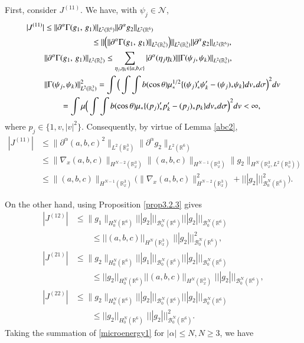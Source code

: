 \documentclass{amsart}[12pt, article]
\begin{document}
First, consider $J^{(11)}$. We have, with $\psi_j\in\mathcal{N}$,
\begin{align}\label{J11}
|J^{(11)}|&
\le
\|{{\partial}}^\alpha\Gamma(g_1,\,g_1)\|_{L^2({{{\mathbb R}}}^6)}    \|{{\partial}}^\alpha g_2\|_{L^2({{{\mathbb R}}}^6)}
\\&
\notag
\hspace*{2cm}\le \|\Big(\|{{\partial}}^\alpha \Gamma(g_1,\,g_1)\|_{L^2({{{\mathbb R}}}^3_v)}
\Big)\|_{L^2({{{\mathbb R}}}^3_x)}    \|{{\partial}}^\alpha g_2\|_{L^2({{{\mathbb R}}}^6)},
\\ \notag
&\| {{\partial}}^\alpha\Gamma(g_1,\,g_1)\|_{L^2({{{\mathbb R}}}^3_v)}\le
\sum_{\eta_j,\eta_k\in \{a,b,c\}} |{{\partial}}^\alpha(\eta_j\eta_k)|
\|\Gamma(\psi_j,\psi_k)\|_{L^2({{{\mathbb R}}}^3_v)},
\\ \notag
&\|\Gamma(\psi_j,\psi_k)\|_{L^2({{{\mathbb R}}}^3_v)}^2=\int\Big(\int\int b(\cos\theta)\mu_*^{1/2}
\{ (\psi_j)_*' \psi_k'-(\psi_j)_*\psi_k\}dv_*d\sigma\Big)^2dv \notag
\\&\qquad \notag
=\int\mu\Big(\int\int b(\cos\theta)\mu_*
\{ (p_j)_*' p_k'-(p_j)_*p_k\}dv_*d\sigma\Big)^2dv<\infty,
\end{align}
where $p_j\in\{1,v,|v|^2\}$.
Consequently, by virtue of Lemma \ref{abc2},
\begin{align*}
|J^{(11)}|&
\le \|{{\partial}}^\alpha (a,b,c)^2\|_{L^2({{{\mathbb R}}}^3_x)} \|{{\partial}}^\alpha g_2\|_{L^2({{{\mathbb R}}}^6)}
\\&
 \le
\|\nabla_x (a,b,c)\|_{H^{N-2}({{{\mathbb R}}}^3_x)}\|(a,b,c)\|_{H^{N-1}({{{\mathbb R}}}^3_x)}\|g_2\|_{H^N({{{\mathbb R}}}^3_x, L^2({{{\mathbb R}}}^3_v))}
\\
&\le \|(a,b,c)\|_{H^{N-1}({{{\mathbb R}}}^3_x)}\Big(\|\nabla_x (a,b,c)\|_{H^{N-2}({{{\mathbb R}}}^3_x)}^2+
|||g_2|||_{{{\mathcal B}}^{N}_0({{{\mathbb R}}}^6)}^2\Big).
\end{align*}

On the other hand, using Proposition \ref{prop3.2.3} gives
\begin{align*}
|J^{(12)}|&\le \|g_1\|_{H^N_0({{{\mathbb R}}}^6)}|||g_2|||_{{{\mathcal B}}^{N}_0({{{\mathbb R}}}^6)}
|||g_2|||_{{{\mathcal B}}^{N}_0({{{\mathbb R}}}^6)}
\\&\quad\quad\leq ||(a,b,c)||_{H^N({{{\mathbb R}}}^3_x)}\,\,
||| g_2|||_{{{\mathcal B}}^{N}_0({{{\mathbb R}}}^6)}^2,
\\
|J^{(21)}|&\le \|g_2\|_{H^N_0({{{\mathbb R}}}^6)}|||g_1|||_{{{\mathcal B}}^{N}_0({{{\mathbb R}}}^6)}
|||g_2|||_{{{\mathcal B}}^{N}_0({{{\mathbb R}}}^6)}
\\&\quad\quad\leq  ||g_2||_{H^N_0({{{\mathbb R}}}^6)}||(a,b,c)||_{H^N({{{\mathbb R}}}^3_x)}\,\,
||| g_2|||_{{{\mathcal B}}^{N}_0({{{\mathbb R}}}^6)},
\\
|J^{(22)}|&\le \|g_2\|_{H^N_0({{{\mathbb R}}}^6)}|||g_2|||_{{{\mathcal B}}^{N}_0({{{\mathbb R}}}^6)}
|||g_2|||_{{{\mathcal B}}^{N}_0({{{\mathbb R}}}^6)}
\\&\quad\quad\leq ||g_2||_{H^N_0({{{\mathbb R}}}^6)}\,\,
||| g_2|||_{{{\mathcal B}}^{N}_0({{{\mathbb R}}}^6)}^2.
\end{align*}
Taking the summation of \eqref{microenergy1} for $|\alpha|\le N, N\ge 3$, we have
\end{document}
